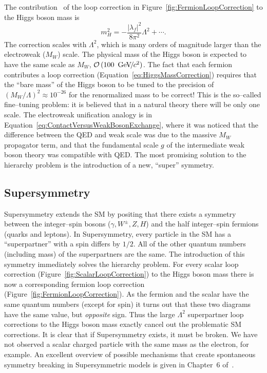 The contribution~\cite{Martin:1997um}  of the loop correction in
Figure~\ref{fig:FermionLoopCorrection} to the Higgs boson mass is
\begin{equation}
  m^2_H = -\frac{|\lambda_f|^2}{8 \pi^2} \Lambda^2 + \cdots.
  \label{eq:HiggsMassCorrection}
\end{equation}
The correction scales with $\Lambda^2$, which is many orders of magnitude larger
than the electroweak ($M_W$) scale.  The physical mass of the Higgs boson is expected
to have the same scale as $M_W$, $\mbox{\ensuremath{\mathcal{O}\left(100~{\,\text{Ge\hspace{-.08em}V\hspace{-0.16em}/\hspace{-0.08em}}c^\text{2}}\right)}}$.  The fact that each fermion
contributes a loop correction (Equation~\ref{eq:HiggsMassCorrection}) requires
that the ``bare mass'' of the Higgs boson to be tuned to the precision of
$(M_W/\Lambda)^2 \approx 10^{-26}$ for the renormalized mass to be correct!
This is the so--called fine--tuning problem: it is believed that in a natural
theory there will be only one scale.  The electroweak unification analogy is in
Equation~\ref{eq:ContactVersusWeakBosonExchange}, where it was noticed that the
difference between the QED and weak scale was due to the massive $M_W$
propagator term, and that the fundamental scale $g$ of the intermediate weak
boson theory was compatible with QED\@.  The most promising solution to the
hierarchy problem is the introduction of a new, ``super'' symmetry.

\subsection{Supersymmetry}
Supersymmetry extends the SM by positing that there exists a
symmetry between the integer--spin bosons ($\gamma, W^\pm, Z, H$) and the half
integer--spin fermions (quarks and leptons).  In Supersymmetry, every particle
in the SM has a ``superpartner'' with a spin differs by $1/2$.  All
of the other quantum numbers (including mass) of the superpartners are the same.
The introduction of this symmetry immediately solves the hierarchy problem.  For
every scalar loop correction (Figure~\ref{fig:ScalarLoopCorrection}) to the
Higgs boson mass there is now a corresponding fermion loop correction
(Figure~\ref{fig:FermionLoopCorrection}).  As the fermion and the scalar have
the same quantum numbers (except for spin) it turns out that these two diagrams
have the same value, but \emph{opposite} sign.  Thus the large $\Lambda^2$
superpartner loop corrections to the Higgs boson mass exactly cancel out the
problematic SM corrections.  It is clear that if Supersymmetry
exists, it must be broken.  We have not observed a scalar charged particle with
the same mass as the electron, for example.  An excellent overview of possible
mechanisms that create spontaneous symmetry breaking in Supersymmetric models is
given in Chapter~6 of~\cite{Martin:1997um}.

